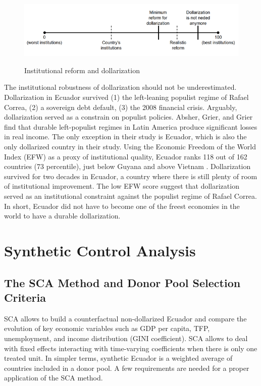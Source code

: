 \documentclass[12pt]{article}
\begin{document}
\begin{figure}[!htbp]
    \caption{Institutional reform and dollarization}
    \centering
    \includegraphics{Fig_01.png}
    \label{fig:Fig01}
\end{figure}

The institutional robustness of dollarization should not be underestimated. Dollarization in Ecuador survived (1) the left-leaning populist regime of Rafael Correa, (2) a sovereign debt default, (3) the 2008 financial crisis. Arguably, dollarization served as a constrain on populist policies. Absher, Grier, and Grier \parencite*{Absher2020} find that durable left-populist regimes in Latin America produce significant losses in real income. The only exception in their study is Ecuador, which is also the only dollarized country in their study. Using the Economic Freedom of the World Index (EFW) as a proxy of institutional quality, Ecuador ranks 118 out of 162 countries (73 percentile), just below Guyana and above Vietnam \parencite{EFW_2019}. Dollarization survived for two decades in Ecuador, a country where there is still plenty of room of institutional improvement. The low EFW score suggest that dollarization served as an institutional constraint against the populist regime of Rafael Correa. In short, Ecuador did not have to become one of the freest economies in the world to have a durable dollarization.


\section{Synthetic Control Analysis}
    \label{sec:SCA}

\subsection{The SCA Method and Donor Pool Selection Criteria}

SCA allows to build a counterfactual non-dollarized Ecuador and compare the evolution of key economic variables such as GDP per capita, TFP, unemployment, and income distribution (GINI coefficient). SCA allows to deal with fixed effects interacting with time-varying coefficients when there is only one treated unit. In simpler terms, synthetic Ecuador is a weighted average of countries included in a donor pool. A few requirements are needed for a proper application of the SCA method.
\end{document}
